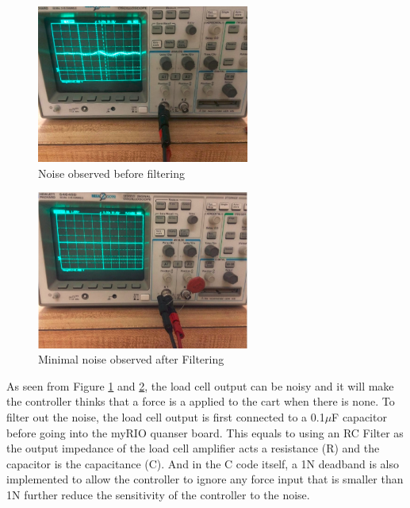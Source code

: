 \begin{figure}[ht]
\begin{center}
\includegraphics[width=2.75in]{Images/Before_Filter.PNG}
\caption{Noise observed before filtering}
\label{B_Filter}
\end{center}
\end{figure}
\begin{figure}[ht]
\begin{center}
\includegraphics[width=2.75in]{Images/After_Filter.PNG}
\caption{Minimal noise observed after Filtering}
\label{A_Filter}
\end{center}
\end{figure}
As seen from Figure \ref{B_Filter} and \ref{A_Filter}, the load cell output can be noisy and it will make the controller thinks that a force is a applied to the cart when there is none. To filter out the noise, the load cell output is first connected to a 0.1$\mu$F capacitor before going into the myRIO quanser board. This equals to using an RC Filter as the output impedance of the load cell amplifier acts a resistance (R) and the capacitor is the capacitance (C). And in the C code itself, a 1N deadband is also implemented to allow the controller to ignore any force input that is smaller than 1N further reduce the sensitivity of the controller to the noise.
